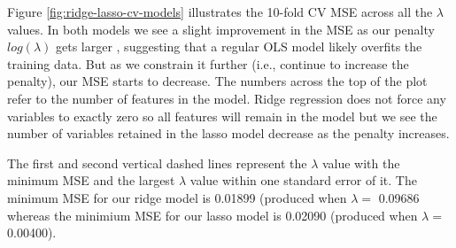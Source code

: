 \documentclass[]{krantz}
\makeatletter
\newenvironment{Shaded}{\begin{snugshade}}{\end{snugshade}}
\newcommand{\CommentTok}[1]{\textcolor[rgb]{0.37,0.37,0.37}{\textit{#1}}}
\newcommand{\FloatTok}[1]{\textcolor[rgb]{0.06,0.06,0.06}{#1}}
\newcommand{\KeywordTok}[1]{\textcolor[rgb]{0.27,0.27,0.27}{\textbf{#1}}}
\newcommand{\NormalTok}[1]{#1}
\newcommand{\OperatorTok}[1]{\textcolor[rgb]{0.43,0.43,0.43}{\textbf{#1}}}
\newcommand{\StringTok}[1]{\textcolor[rgb]{0.5,0.5,0.5}{#1}}
\newenvironment{kframe}{%
\medskip{}
\setlength{\fboxsep}{.8em}
 \def\at@end@of@kframe{}%
 \ifinner\ifhmode%
  \def\at@end@of@kframe{\end{minipage}}%
  \begin{minipage}{\columnwidth}%
 \fi\fi%
 \def\FrameCommand##1{\hskip\@totalleftmargin \hskip-\fboxsep
 \colorbox{shadecolor}{##1}\hskip-\fboxsep
     \hskip-\linewidth \hskip-\@totalleftmargin \hskip\columnwidth}%
 \MakeFramed {\advance\hsize-\width
   \@totalleftmargin\z@ \linewidth\hsize
   \@setminipage}}%
 {\par\unskip\endMakeFramed%
 \at@end@of@kframe}
\renewenvironment{Shaded}{\begin{kframe}}{\end{kframe}}
\makeatother
\begin{document}
Figure \ref{fig:ridge-lasso-cv-models} illustrates the 10-fold CV MSE across all the \(\lambda\) values. In both models we see a slight improvement in the MSE as our penalty \(log(\lambda)\) gets larger , suggesting that a regular OLS model likely overfits the training data. But as we constrain it further (i.e., continue to increase the penalty), our MSE starts to decrease. The numbers across the top of the plot refer to the number of features in the model. Ridge regression does not force any variables to exactly zero so all features will remain in the model but we see the number of variables retained in the lasso model decrease as the penalty increases.

The first and second vertical dashed lines represent the \(\lambda\) value with the minimum MSE and the largest \(\lambda\) value within one standard error of it. The minimum MSE for our ridge model is 0.01899 (produced when \(\lambda =\) 0.09686 whereas the minimium MSE for our lasso model is 0.02090 (produced when \(\lambda =\) 0.00400).

\begin{Shaded}
\end{Shaded}
\end{document}
